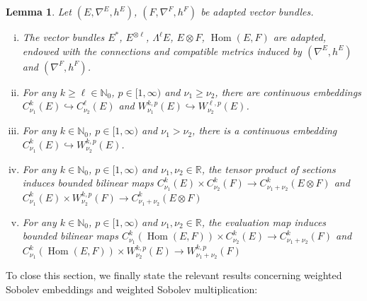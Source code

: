 \documentclass{article}
\numberwithin{equation}{section}        %
\theoremstyle{bfnote}
\newtheorem{lem}[thm]{Lemma}                %
\theoremstyle{definition}
\theoremstyle{bfremark}
\newcommand{\N}{\mathbb{N}}                 %
\newcommand{\R}{\mathbb{R}}                 %
\DeclareMathOperator{\Hom}{Hom}                 %
\begin{document}
\begin{lem}     \label{lem: Natural properties of weighted spaces}
    Let $(E,\nabla^E,h^E)$, $(F,\nabla^F,h^F)$ be adapted vector bundles.
    \begin{enumerate}[(i)]
        \item The vector bundles $E^*$, $E^{\otimes \ell}$, $\Lambda^\ell E$, $E \otimes F$, $\Hom(E,F)$ are adapted, endowed with the connections and compatible metrics induced by $(\nabla^E,h^E)$ and $(\nabla^F,h^F)$.

        \item For any $k \geq \ell \in \N_0$, $p \in [1,\infty)$ and $\nu_1 \geq \nu_2$, there are continuous embeddings $C^{k}_{\nu_1}(E) \hookrightarrow C^{\ell}_{\nu_2}(E)$ and $W^{k,p}_{\nu_1}(E) \hookrightarrow W^{\ell,p}_{\nu_2}(E)$.
        
        \item For any $k \in \N_0$, $p \in [1,\infty)$ and $\nu_1 > \nu_2$, there is a continuous embedding $C^k_{\nu_1}(E) \hookrightarrow W^{k,p}_{\nu_2}(E)$.

        \item For any $k \in \N_0$, $p \in [1,\infty)$ and $\nu_1, \nu_2 \in \R$, the tensor product of sections induces bounded bilinear maps $C^{k}_{\nu_1}(E) \times C^{k}_{\nu_2}(F) \to C^{k}_{\nu_1+\nu_2}(E \otimes F)$ and $C^{k}_{\nu_1}(E) \times W^{k,p}_{\nu_2}(F) \to C^{k}_{\nu_1+\nu_2}(E \otimes F)$

        \item For any $k \in \N_0$, $p \in [1,\infty)$ and $\nu_1, \nu_2 \in \R$, the evaluation map induces bounded bilinear maps $C^{k}_{\nu_1}(\Hom(E,F)) \times C^{k}_{\nu_2}(E) \to C^{k}_{\nu_1+\nu_2}(F)$ and $C^{k}_{\nu_1}(\Hom(E,F)) \times W^{k,p}_{\nu_2}(E) \to W^{k,p}_{\nu_1+\nu_2}(F)$
    \end{enumerate}
\end{lem}

To close this section, we finally state the relevant results concerning weighted Sobolev embeddings and weighted Sobolev multiplication:
\end{document}
